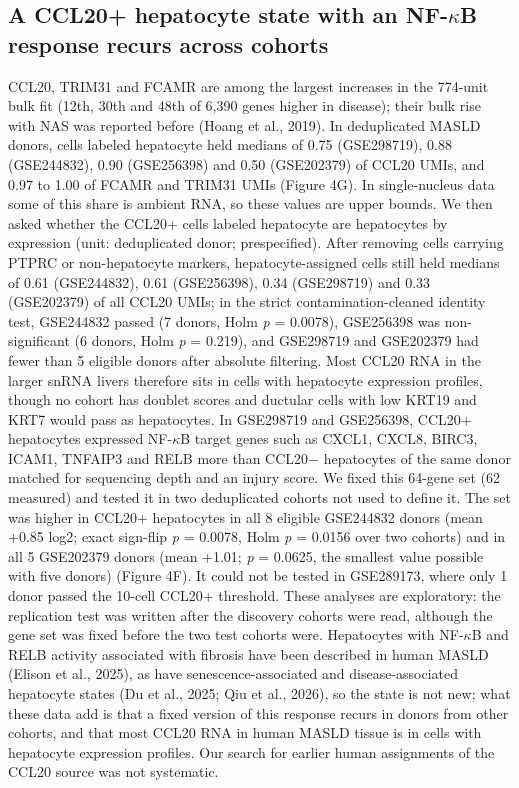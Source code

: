 \subsection{A CCL20+ hepatocyte state with an \texorpdfstring{NF-$\kappa$B}{NF-kB} response recurs across cohorts}\label{a-ccl20-hepatocyte-state-with-an-nf-kb-response-recurs-across-cohorts}

CCL20, TRIM31 and FCAMR are among the largest increases in the 774-unit bulk fit (12th, 30th and 48th of 6,390 genes higher in disease); their bulk rise with NAS was reported before (Hoang et al., 2019). In deduplicated MASLD donors, cells labeled hepatocyte held medians of 0.75 (GSE298719), 0.88 (GSE244832), 0.90 (GSE256398) and 0.50 (GSE202379) of CCL20 UMIs, and 0.97 to 1.00 of FCAMR and TRIM31 UMIs (Figure 4G). In single-nucleus data some of this share is ambient RNA, so these values are upper bounds. We then asked whether the CCL20+ cells labeled hepatocyte are hepatocytes by expression (unit: deduplicated donor; prespecified). After removing cells carrying PTPRC or non-hepatocyte markers, hepatocyte-assigned cells still held medians of 0.61 (GSE244832), 0.61 (GSE256398), 0.34 (GSE298719) and 0.33 (GSE202379) of all CCL20 UMIs; in the strict contamination-cleaned identity test, GSE244832 passed (7 donors, Holm \emph{p} = 0.0078), GSE256398 was non-significant (6 donors, Holm \emph{p} = 0.219), and GSE298719 and GSE202379 had fewer than 5 eligible donors after absolute filtering. Most CCL20 RNA in the larger snRNA livers therefore sits in cells with hepatocyte expression profiles, though no cohort has doublet scores and ductular cells with low KRT19 and KRT7 would pass as hepatocytes. In GSE298719 and GSE256398, CCL20+ hepatocytes expressed NF-$\kappa$B target genes such as CXCL1, CXCL8, BIRC3, ICAM1, TNFAIP3 and RELB more than CCL20$-$ hepatocytes of the same donor matched for sequencing depth and an injury score. We fixed this 64-gene set (62 measured) and tested it in two deduplicated cohorts not used to define it. The set was higher in CCL20+ hepatocytes in all 8 eligible GSE244832 donors (mean +0.85 log2; exact sign-flip \emph{p} = 0.0078, Holm \emph{p} = 0.0156 over two cohorts) and in all 5 GSE202379 donors (mean +1.01; \emph{p} = 0.0625, the smallest value possible with five donors) (Figure 4F). It could not be tested in GSE289173, where only 1 donor passed the 10-cell CCL20+ threshold. These analyses are exploratory: the replication test was written after the discovery cohorts were read, although the gene set was fixed before the two test cohorts were. Hepatocytes with NF-$\kappa$B and RELB activity associated with fibrosis have been described in human MASLD (Elison et al., 2025), as have senescence-associated and disease-associated hepatocyte states (Du et al., 2025; Qiu et al., 2026), so the state is not new; what these data add is that a fixed version of this response recurs in donors from other cohorts, and that most CCL20 RNA in human MASLD tissue is in cells with hepatocyte expression profiles. Our search for earlier human assignments of the CCL20 source was not systematic.

